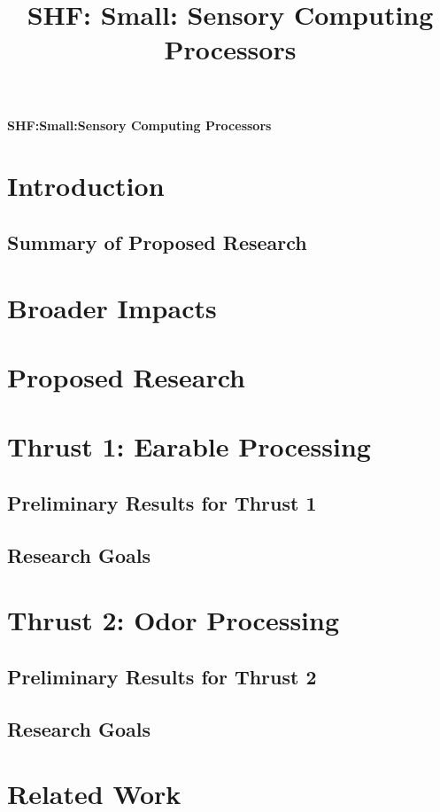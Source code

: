 \documentclass[11 pt]{article}
\title{SHF: Small: Sensory Computing Processors}
\begin{document}
\begin{center}
{\Large \textbf{SHF:Small:Sensory Computing Processors}}
\end{center}

\section{Introduction}


\subsection{Summary of Proposed Research}
\label{ssec:summary}


\section{Broader Impacts}


\section{Proposed Research}


\section{Thrust 1: Earable Processing}
\label{sec:tract1}
\subsection{Preliminary Results for Thrust 1}
\label{ssec:prelim1}

\subsection{Research Goals}
\label{ssec:research1}


\section{Thrust 2: Odor Processing}
\label{sec:tract2}
\subsection{Preliminary Results for Thrust 2}
\label{ssec:prelim2}

\subsection{Research Goals}
\label{ssec:research2}


\section{Related Work}

\end{document}
